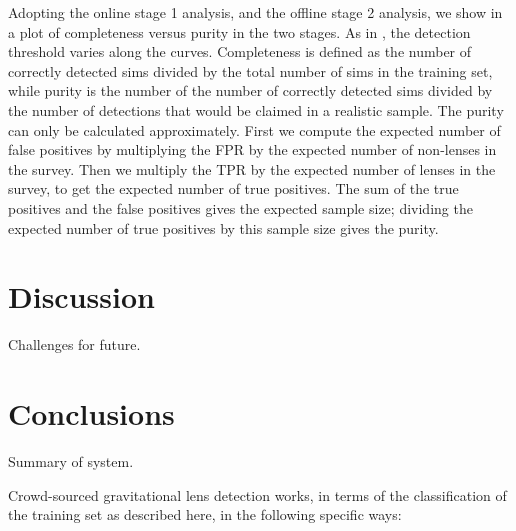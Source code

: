 \documentclass[useAMS,usenatbib,a4paper]{mn2e}
\begin{document}

Adopting the online stage 1 analysis, and the offline stage 2 analysis, we
show in  a plot of completeness versus purity in
the two stages. As in , the detection threshold
varies along the curves. Completeness is defined as the number of correctly 
detected sims divided by the total number of sims in the training set, while
purity is the number of the number of correctly detected sims divided by the
number of detections that would be claimed in a realistic sample. The purity
can only be calculated approximately. First we compute the expected number of
false positives by multiplying the FPR by the expected number of non-lenses in
the survey. Then we multiply the TPR by the expected number of lenses in the
survey, to get the expected number of true positives. The sum of the true
positives and the false positives gives the expected sample size; dividing the
expected number of true positives by this sample size gives the purity.




\section{Discussion}
\label{sec:discuss}

Challenges for future.


\section{Conclusions}
\label{sec:conclude}

Summary of system.

Crowd-sourced gravitational lens detection works, in terms of the
classification of the training set as described here, in the following
specific ways: 
\end{document}
